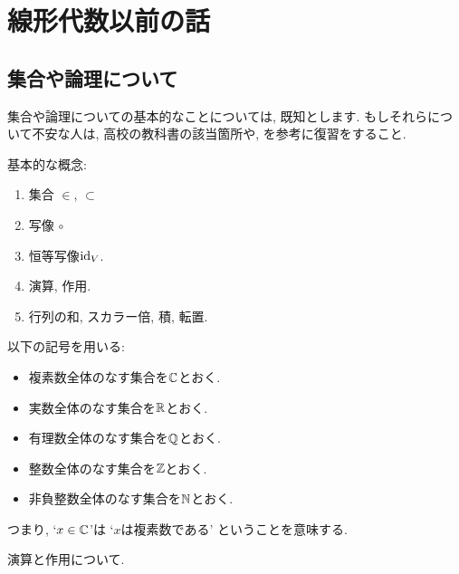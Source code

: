 \tableofcontents

\chapter{線形代数以前の話}


\section{集合や論理について}

集合や論理についての基本的なことについては,
既知とします.
もしそれらについて不安な人は,
高校の教科書の該当箇所や,
\cite{978-4-535-78682-0}
を参考に復習をすること.

基本的な概念:
\begin{enumerate}
  \item 集合 $\in$, $\subset$
  \item 写像 $\circ$
  \item 恒等写像$\operatorname{id}_V$.
  \item 演算, 作用.
  \item 行列の和, スカラー倍, 積, 転置.
\end{enumerate}


以下の記号を用いる:
\begin{itemize}
\item 複素数全体のなす集合を$\mathbb{C}$とおく.
\item 実数全体のなす集合を$\mathbb{R}$とおく.
\item 有理数全体のなす集合を$\mathbb{Q}$とおく.
\item 整数全体のなす集合を$\mathbb{Z}$とおく.
\item 非負整数全体のなす集合を$\mathbb{N}$とおく.
\end{itemize}
つまり,
`$x\in\mathbb{C}$'は
`$x$は複素数である'
ということを意味する.

演算と作用について.

